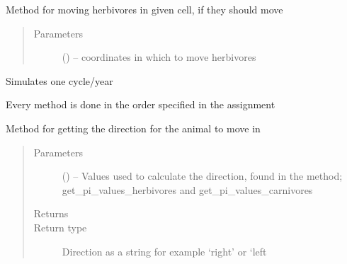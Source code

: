\documentclass[a4paper,10pt,english]{sphinxmanual}
\begin{document}
\begin{fulllineitems}
\begin{fulllineitems}
\label{\detokenize{island:biosim.island.Island.cell_move_herbivores}}
Method for moving herbivores in given cell, if they should move
\begin{quote}\begin{description}
\item[{Parameters}] \leavevmode
{} () -- coordinates in which to move herbivores

\end{description}\end{quote}

\end{fulllineitems}


\begin{fulllineitems}
\label{\detokenize{island:biosim.island.Island.cycle}}
Simulates one cycle/year

Every method is done in the order specified in the assignment

\end{fulllineitems}


\begin{fulllineitems}
\label{\detokenize{island:biosim.island.Island.get_direction}}
Method for getting the direction for the animal to move in
\begin{quote}\begin{description}
\item[{Parameters}] \leavevmode
{} () -- Values used to calculate the direction, found in the method;
get\_pi\_values\_herbivores and get\_pi\_values\_carnivores

\item[{Returns}] \leavevmode


\item[{Return type}] \leavevmode
Direction as a string for example `right' or `left

\end{description}\end{quote}


\end{fulllineitems}
\end{fulllineitems}
\end{document}
